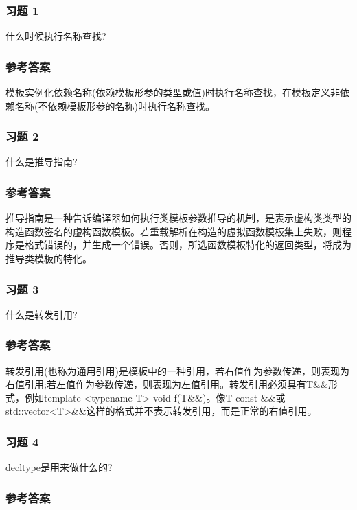 \subsubsection{习题 1}

什么时候执行名称查找?

\subsubsection{参考答案}

模板实例化依赖名称(依赖模板形参的类型或值)时执行名称查找，在模板定义非依赖名称(不依赖模板形参的名称)时执行名称查找。


\subsubsection{习题 2}

什么是推导指南?

\subsubsection{参考答案}

推导指南是一种告诉编译器如何执行类模板参数推导的机制，是表示虚构类类型的构造函数签名的虚构函数模板。若重载解析在构造的虚拟函数模板集上失败，则程序是格式错误的，并生成一个错误。否则，所选函数模板特化的返回类型，将成为推导类模板的特化。

\subsubsection{习题 3}

什么是转发引用?

\subsubsection{参考答案}

转发引用(也称为通用引用)是模板中的一种引用，若右值作为参数传递，则表现为右值引用;若左值作为参数传递，则表现为左值引用。转发引用必须具有T\&\&形式，例如template <typename T> void f(T\&\&)。像T const \&\&或std::vector<T>\&\&这样的格式并不表示转发引用，而是正常的右值引用。

\subsubsection{习题 4}

decltype是用来做什么的?

\subsubsection{参考答案}

